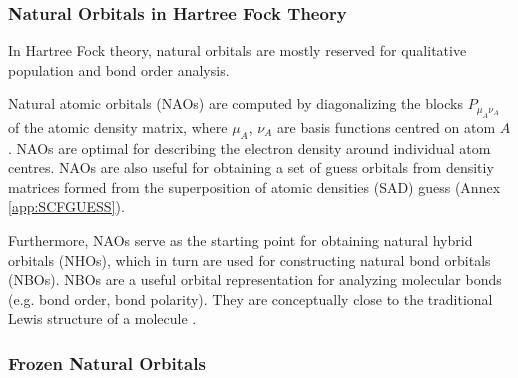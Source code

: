 

\subsubsection{Natural Orbitals in Hartree Fock Theory}

In Hartree Fock theory, natural orbitals are mostly reserved for qualitative population and bond order analysis. 

Natural atomic orbitals (NAOs) are computed by diagonalizing the blocks $P_{\mu_A\nu_A}$ of the atomic density matrix, where ${\mu_A}$, ${\nu_A}$ are basis functions centred on atom $A$. NAOs are optimal for describing the electron density around individual atom centres. NAOs are also useful for obtaining a set of guess orbitals from densitiy matrices formed from the superposition of atomic densities (SAD) guess (Annex \ref{app:SCFGUESS}). 

Furthermore, NAOs serve as the starting point for obtaining natural hybrid orbitals (NHOs), which in turn are used for constructing natural bond orbitals (NBOs). NBOs are a useful orbital representation for  analyzing molecular bonds (e.g. bond order, bond polarity). They are conceptually close to the traditional Lewis structure of a molecule \cite{Ree1983,Wei2001,Gle2012}.


\subsubsection{Frozen Natural Orbitals}


